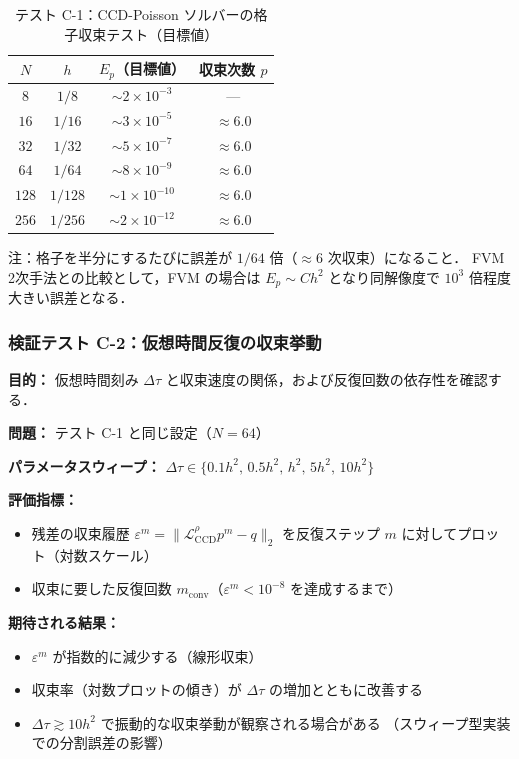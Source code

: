 \begin{table}[htbp]
\centering
\caption{テスト C-1：CCD-Poisson ソルバーの格子収束テスト（目標値）}
\label{tab:ccd_poisson_conv}
\begin{tabular}{cccc}
\toprule
$N$ & $h$ & $E_p$（目標値） & 収束次数 $p$ \\
\midrule
$8$   & $1/8$   & $\sim 2 \times 10^{-3}$ & --- \\
$16$  & $1/16$  & $\sim 3 \times 10^{-5}$ & $\approx 6.0$ \\
$32$  & $1/32$  & $\sim 5 \times 10^{-7}$ & $\approx 6.0$ \\
$64$  & $1/64$  & $\sim 8 \times 10^{-9}$ & $\approx 6.0$ \\
$128$ & $1/128$ & $\sim 1 \times 10^{-10}$ & $\approx 6.0$ \\
$256$ & $1/256$ & $\sim 2 \times 10^{-12}$ & $\approx 6.0$ \\
\bottomrule
\end{tabular}

\medskip
注：格子を半分にするたびに誤差が $1/64$ 倍（$\approx 6$ 次収束）になること．
FVM 2次手法との比較として，FVM の場合は $E_p \sim C h^2$ となり同解像度で $10^3$ 倍程度大きい誤差となる．
\end{table}

\subsubsection{検証テスト C-2：仮想時間反復の収束挙動}
\label{sec:ccd_test_c2}

\begin{tcolorbox}[algbox, title={テスト C-2 の設定}]
\textbf{目的：} 仮想時間刻み $\Delta\tau$ と収束速度の関係，および反復回数の依存性を確認する．

\textbf{問題：} テスト C-1 と同じ設定（$N=64$）

\textbf{パラメータスウィープ：}
$\Delta\tau \in \{0.1h^2,\, 0.5h^2,\, h^2,\, 5h^2,\, 10h^2\}$

\textbf{評価指標：}
\begin{itemize}
  \item 残差の収束履歴 $\varepsilon^m = \|\mathcal{L}_{\mathrm{CCD}}^{\rho}p^m - q\|_2$
        を反復ステップ $m$ に対してプロット（対数スケール）
  \item 収束に要した反復回数 $m_{\mathrm{conv}}$（$\varepsilon^m < 10^{-8}$ を達成するまで）
\end{itemize}

\textbf{期待される結果：}
\begin{itemize}
  \item $\varepsilon^m$ が指数的に減少する（線形収束）
  \item 収束率（対数プロットの傾き）が $\Delta\tau$ の増加とともに改善する
  \item $\Delta\tau \gtrsim 10h^2$ で振動的な収束挙動が観察される場合がある
        （スウィープ型実装での分割誤差の影響）
\end{itemize}
\end{tcolorbox}

